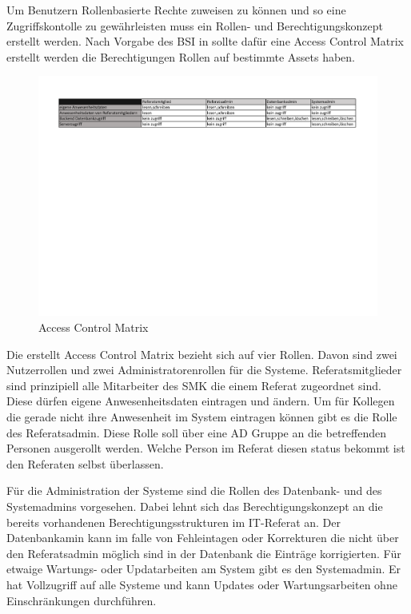 Um Benutzern Rollenbasierte Rechte zuweisen zu können und so eine Zugriffskontolle zu gewährleisten muss ein Rollen- und Berechtigungskonzept erstellt werden. Nach Vorgabe des BSI in \cite[KOP3]{BSIWeb} sollte dafür eine Access Control Matrix erstellt werden die Berechtigungen Rollen
auf bestimmte Assets haben.

\begin{figure}[htbp]
    \centering
    \includegraphics[width=1\textwidth,angle=0]{abb/Berechtigungsmatrix.pdf}
    \caption[Beschreibung]{Access Control Matrix}
    \label{abb:AccessControlMatrix}
\end{figure}

Die erstellt Access Control Matrix bezieht sich auf vier Rollen. Davon sind zwei Nutzerrollen und zwei Administratorenrollen für die Systeme. Referatsmitglieder sind prinzipiell alle Mitarbeiter des SMK die einem Referat zugeordnet sind. Diese dürfen eigene Anwesenheitsdaten eintragen und \ggfs ändern. Um für Kollegen die gerade nicht ihre Anwesenheit im System eintragen können gibt es die Rolle des Referatsadmin. Diese Rolle soll über eine AD Gruppe an die betreffenden Personen ausgerollt werden. Welche Person im Referat diesen status bekommt ist den Referaten selbst überlassen.

Für die Administration der Systeme sind die Rollen des Datenbank- und des Systemadmins vorgesehen. Dabei lehnt sich das Berechtigungskonzept an die bereits vorhandenen Berechtigungsstrukturen im IT-Referat an. Der Datenbankamin kann im falle von Fehleintagen oder Korrekturen die nicht über den Referatsadmin möglich sind in der Datenbank die Einträge korrigierten. Für etwaige Wartungs- oder Updatarbeiten am System gibt es den Systemadmin. Er hat Vollzugriff auf alle Systeme und kann Updates oder Wartungsarbeiten ohne Einschränkungen durchführen.



